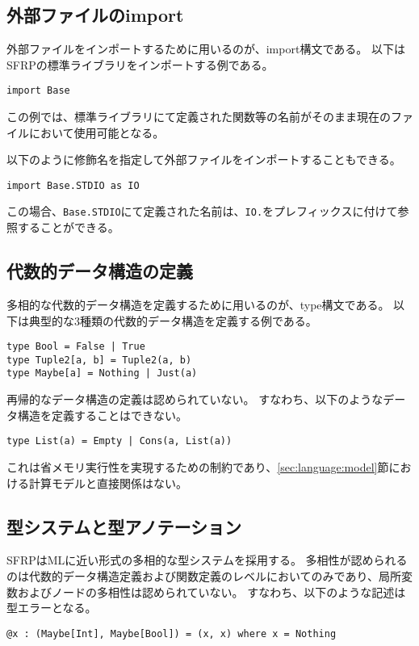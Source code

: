 \subsection{外部ファイルのimport}
外部ファイルをインポートするために用いるのが、import構文である。
以下はSFRPの標準ライブラリをインポートする例である。
\begin{lstlisting}[basicstyle=\ttfamily\small,language=SFRP]
import Base
\end{lstlisting}
この例では、標準ライブラリにて定義された関数等の名前がそのまま現在のファイルにおいて使用可能となる。

以下のように修飾名を指定して外部ファイルをインポートすることもできる。
\begin{lstlisting}[basicstyle=\ttfamily\small,language=SFRP]
import Base.STDIO as IO
\end{lstlisting}
この場合、\texttt{Base.STDIO}にて定義された名前は、\texttt{IO.}をプレフィックスに付けて参照することができる。

\subsection{代数的データ構造の定義}
多相的な代数的データ構造を定義するために用いるのが、type構文である。
以下は典型的な3種類の代数的データ構造を定義する例である。
\begin{lstlisting}[basicstyle=\ttfamily\small,language=SFRP]
type Bool = False | True
type Tuple2[a, b] = Tuple2(a, b)
type Maybe[a] = Nothing | Just(a)
\end{lstlisting}

再帰的なデータ構造の定義は認められていない。
すなわち、以下のようなデータ構造を定義することはできない。
\begin{lstlisting}[basicstyle=\ttfamily\small,language=SFRP]
type List(a) = Empty | Cons(a, List(a))
\end{lstlisting}
これは省メモリ実行性を実現するための制約であり、\ref{sec:language:model}節における計算モデルと直接関係はない。

\subsection{型システムと型アノテーション}
SFRPはMLに近い形式の多相的な型システムを採用する。
多相性が認められるのは代数的データ構造定義および関数定義のレベルにおいてのみであり、局所変数およびノードの多相性は認められていない。
すなわち、以下のような記述は型エラーとなる。
\begin{lstlisting}[basicstyle=\ttfamily\small,language=SFRP]
@x : (Maybe[Int], Maybe[Bool]) = (x, x) where x = Nothing
\end{lstlisting}

